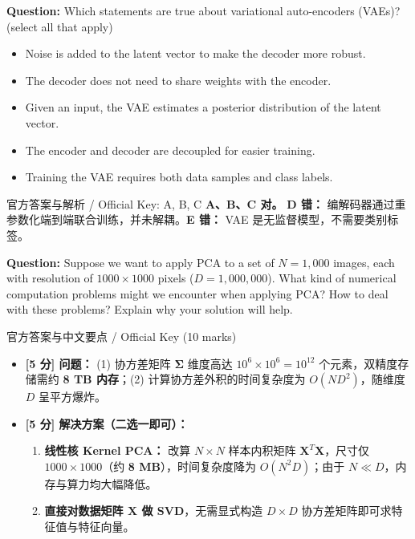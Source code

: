 \textbf{Question:} Which statements are true about variational auto-encoders (VAEs)? (select all that apply)
\begin{itemize}
\item[A)] Noise is added to the latent vector to make the decoder more robust.
\item[B)] The decoder does not need to share weights with the encoder.
\item[C)] Given an input, the VAE estimates a posterior distribution of the latent vector.
\item[D)] The encoder and decoder are decoupled for easier training.
\item[E)] Training the VAE requires both data samples and class labels.
\end{itemize}

\begin{StudySolution}{官方答案与解析 / Official Key: A, B, C}
\textbf{A、B、C 对。} \textbf{D 错：} 编解码器通过重参数化端到端联合训练，并未解耦。\textbf{E 错：} VAE 是无监督模型，不需要类别标签。
\end{StudySolution}


\textbf{Question:} Suppose we want to apply PCA to a set of $N=1,000$ images, each with resolution of $1000\times 1000$ pixels ($D=1,000,000$). What kind of numerical computation problems might we encounter when applying PCA? How to deal with these problems? Explain why your solution will help.

\begin{StudySolution}{官方答案与中文要点 / Official Key (10 marks)}
\begin{itemize}
\item \textbf{[5 分] 问题：} (1) 协方差矩阵 $\boldsymbol{\Sigma}$ 维度高达 $10^6\times 10^6 = 10^{12}$ 个元素，双精度存储需约 \textbf{8 TB 内存}；(2) 计算协方差外积的时间复杂度为 $O(ND^2)$，随维度 $D$ 呈平方爆炸。
\item \textbf{[5 分] 解决方案（二选一即可）：}
  \begin{enumerate}
  \item \textbf{线性核 Kernel PCA：} 改算 $N\times N$ 样本内积矩阵 $\mathbf{X}^T\mathbf{X}$，尺寸仅 $1000\times 1000$（约 \textbf{8 MB}），时间复杂度降为 $O(N^2D)$；由于 $N\ll D$，内存与算力均大幅降低。
  \item \textbf{直接对数据矩阵 $\mathbf{X}$ 做 SVD}，无需显式构造 $D\times D$ 协方差矩阵即可求特征值与特征向量。
  \end{enumerate}
\end{itemize}
\end{StudySolution}

